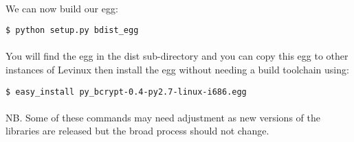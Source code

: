 \documentclass[12pt, a4paper, twoside]{book}
\begin{document}
\paragraph{} We can now build our egg:
\begin{lstlisting}[style=DOS]
    $ python setup.py bdist_egg
\end{lstlisting}

\paragraph{} You will find the egg in the dist sub-directory and you can copy this egg to other instances of Levinux then install the egg without needing a build toolchain using:
\begin{lstlisting}[style=DOS]
    $ easy_install py_bcrypt-0.4-py2.7-linux-i686.egg
\end{lstlisting}

\paragraph{} NB. Some of these commands may need adjustment as new versions of the libraries are released but the broad process should not change.







\backmatter




\end{document}

